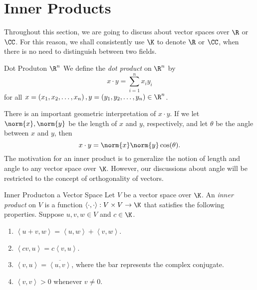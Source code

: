 \documentclass[linearalgebra]{subfiles}
\begin{document}

    \section{Inner Products}
    
    \begin{remark}
        Throughout this section, we are going to discuss about vector spaces over $\R$ or $\CC$. For this reason, we shall consistently use $\K$ to denote $\R$ or $\CC$, when there is no need to distinguish between two fields.
    \end{remark}

    \begin{recall}{Dot Produt}{on $\R^n$}
        We define the \emph{dot product} on $\R^n$ by
        \begin{equation*}
            x\cdot y = \sum^{n}_{i=1} x_iy_i
        \end{equation*}
        for all $x = \left( x_1,x_2,\ldots,x_n \right), y = \left( y_1,y_2,\ldots,y_n \right)\in\R^n$.
    \end{recall}

    \begin{remark}
        There is an important geometric interpretation of $x\cdot y$. If we let $\norm{x}, \norm{y}$ be the length of $x$ and $y$, respectively, and let $\theta$ be the angle between $x$ and $y$, then
        \begin{equation*}
            x\cdot y = \norm{x}\norm{y}\cos(\theta).
        \end{equation*}
        The motivation for an inner product is to generalize the notion of length and angle to any vector space over $\K$. However, our discussions about angle will be restricted to the concept of orthogonality of vectors.
    \end{remark}

    \begin{definition}{Inner Product}{on a Vector Space}
        Let $V$ be a vector space over $\K$. An \emph{inner product} on $V$ is a function $\left\langle \cdot, \cdot\right\rangle : V\times V\to \K$ that satisfies the following properties. Suppose $u,v,w\in V$ and $c\in\K$. 
        \begin{enumerate}
            \item $\left\langle u+v, w\right\rangle = \left\langle u, w\right\rangle  + \left\langle v, w\right\rangle $. 
            \item $\left\langle cv, u\right\rangle  = c\left\langle v, u\right\rangle $.
            \item $\left\langle v, u\right\rangle  = \overline{\left\langle u, v\right\rangle }$, where the bar represents the complex conjugate.
            \item $\left\langle v, v\right\rangle  > 0$ whenever $v\neq 0$.
        \end{enumerate}
    \end{definition}
\end{document}
